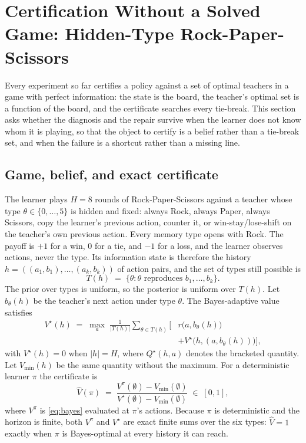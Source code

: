 \documentclass[conference]{IEEEtran}
\begin{document}
\section{Certification Without a Solved Game: Hidden-Type Rock-Paper-Scissors}
\label{sec:rps}

Every experiment so far certifies a policy against a set of optimal teachers in a game with perfect information: the state is the board, the teacher's optimal set is a function of the board, and the certificate searches every tie-break. This section asks whether the diagnosis and the repair survive when the learner does not know whom it is playing, so that the object to certify is a belief rather than a tie-break set, and when the failure is a shortcut rather than a missing line.

\subsection{Game, belief, and exact certificate}
The learner plays $H=8$ rounds of Rock-Paper-Scissors against a teacher whose type $\theta\in\{0,\dots,5\}$ is hidden and fixed: always Rock, always Paper, always Scissors, copy the learner's previous action, counter it, or win-stay/lose-shift on the teacher's own previous action. Every memory type opens with Rock. The payoff is $+1$ for a win, $0$ for a tie, and $-1$ for a loss, and the learner observes actions, never the type. Its information state is therefore the history $h=((a_1,b_1),\dots,(a_k,b_k))$ of action pairs, and the set of types still possible is
\begin{equation}
\label{eq:types}
T(h) \;=\; \{\theta : \theta \text{ reproduces } b_1,\dots,b_k\}.
\end{equation}
The prior over types is uniform, so the posterior is uniform over $T(h)$. Let $b_\theta(h)$ be the teacher's next action under type $\theta$. The Bayes-adaptive value \cite{duff2002} satisfies
\begin{equation}
\label{eq:bayes}
\begin{aligned}
V^{\star}(h) \;=\; \max_{a}\;\frac{1}{|T(h)|}\sum_{\theta\in T(h)}
\bigl[&r\bigl(a,b_\theta(h)\bigr)\\
&+ V^{\star}\bigl(h,(a,b_\theta(h))\bigr)\bigr],
\end{aligned}
\end{equation}
with $V^{\star}(h)=0$ when $|h|=H$, where $Q^{\star}(h,a)$ denotes the bracketed quantity. Let $V_{\min}(h)$ be the same quantity without the maximum. For a deterministic learner $\pi$ the certificate is
\begin{equation}
\label{eq:rpscert}
\hat V(\pi) \;=\; \frac{V^{\pi}(\emptyset)-V_{\min}(\emptyset)}{V^{\star}(\emptyset)-V_{\min}(\emptyset)}
\;\in\;[0,1],
\end{equation}
where $V^{\pi}$ is \eqref{eq:bayes} evaluated at $\pi$'s actions. Because $\pi$ is deterministic and the horizon is finite, both $V^{\pi}$ and $V^{\star}$ are exact finite sums over the six types: $\hat V=1$ exactly when $\pi$ is Bayes-optimal at every history it can reach.
\end{document}
